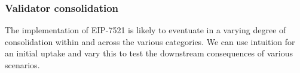 \subsubsection*{Validator consolidation}
 The implementation of EIP-7521 is likely to eventuate in a varying degree of consolidation within and across the various categories. We can use intuition for an initial uptake and vary this to test the downstream consequences of various scenarios.
 
 
 

